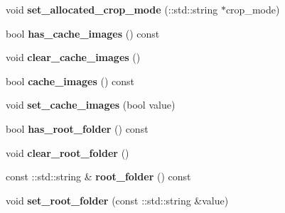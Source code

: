 \begin{DoxyCompactItemize}
\item 
\mbox{\label{classcaffe_1_1_window_data_parameter_a87f94d658a73ed74f28db543d8f2a49c}} 
void {\bfseries set\+\_\+allocated\+\_\+crop\+\_\+mode} (\+::std\+::string $\ast$crop\+\_\+mode)
\item 
\mbox{\label{classcaffe_1_1_window_data_parameter_a2957d4c06e9ec1e36c98a74a9d45a821}} 
bool {\bfseries has\+\_\+cache\+\_\+images} () const
\item 
\mbox{\label{classcaffe_1_1_window_data_parameter_a7ff5970acdcf0f5eed4f98758d24f3ad}} 
void {\bfseries clear\+\_\+cache\+\_\+images} ()
\item 
\mbox{\label{classcaffe_1_1_window_data_parameter_a6168e1c24ea816e991b8c38e453e0157}} 
bool {\bfseries cache\+\_\+images} () const
\item 
\mbox{\label{classcaffe_1_1_window_data_parameter_a314385799ecb70e455bcb7234a999d24}} 
void {\bfseries set\+\_\+cache\+\_\+images} (bool value)
\item 
\mbox{\label{classcaffe_1_1_window_data_parameter_a56d814a28fdf63cc55809d6f7e8b0eac}} 
bool {\bfseries has\+\_\+root\+\_\+folder} () const
\item 
\mbox{\label{classcaffe_1_1_window_data_parameter_a9090274258ddc431fc1f9f51b478849a}} 
void {\bfseries clear\+\_\+root\+\_\+folder} ()
\item 
\mbox{\label{classcaffe_1_1_window_data_parameter_a868a10422f12f7e27f3e4d7b774ab428}} 
const \+::std\+::string \& {\bfseries root\+\_\+folder} () const
\item 
\mbox{\label{classcaffe_1_1_window_data_parameter_aa18a738ff0dcbb200defb25f5e430369}} 
void {\bfseries set\+\_\+root\+\_\+folder} (const \+::std\+::string \&value)
\item 
\mbox{\label{classcaffe_1_1_window_data_parameter_a23f3d5cce40226ad2f66271dc67d7b4b}} 

\end{DoxyCompactItemize}
